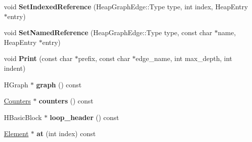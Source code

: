 \begin{DoxyCompactItemize}
\item 
\hypertarget{classv8_1_1internal_1_1_b_a_s_e___e_m_b_e_d_d_e_d_a4a35fe6e32a869862da78762ed93acc9}{}void {\bfseries Set\+Indexed\+Reference} (Heap\+Graph\+Edge\+::\+Type type, int index, Heap\+Entry $\ast$entry)\label{classv8_1_1internal_1_1_b_a_s_e___e_m_b_e_d_d_e_d_a4a35fe6e32a869862da78762ed93acc9}

\item 
\hypertarget{classv8_1_1internal_1_1_b_a_s_e___e_m_b_e_d_d_e_d_a7b46e4d76169f1f95740f096760eaa5f}{}void {\bfseries Set\+Named\+Reference} (Heap\+Graph\+Edge\+::\+Type type, const char $\ast$name, Heap\+Entry $\ast$entry)\label{classv8_1_1internal_1_1_b_a_s_e___e_m_b_e_d_d_e_d_a7b46e4d76169f1f95740f096760eaa5f}

\item 
\hypertarget{classv8_1_1internal_1_1_b_a_s_e___e_m_b_e_d_d_e_d_a2e226396cafd804daba5c33a68d66fe9}{}void {\bfseries Print} (const char $\ast$prefix, const char $\ast$edge\+\_\+name, int max\+\_\+depth, int indent)\label{classv8_1_1internal_1_1_b_a_s_e___e_m_b_e_d_d_e_d_a2e226396cafd804daba5c33a68d66fe9}

\item 
\hypertarget{classv8_1_1internal_1_1_b_a_s_e___e_m_b_e_d_d_e_d_a586a8eaff2221ab14e3b55d7c67cb96f}{}H\+Graph $\ast$ {\bfseries graph} () const \label{classv8_1_1internal_1_1_b_a_s_e___e_m_b_e_d_d_e_d_a586a8eaff2221ab14e3b55d7c67cb96f}

\item 
\hypertarget{classv8_1_1internal_1_1_b_a_s_e___e_m_b_e_d_d_e_d_a7000aae4fa8500fbfcc0ab49b77a9bc4}{}\hyperlink{classv8_1_1internal_1_1_counters}{Counters} $\ast$ {\bfseries counters} () const \label{classv8_1_1internal_1_1_b_a_s_e___e_m_b_e_d_d_e_d_a7000aae4fa8500fbfcc0ab49b77a9bc4}

\item 
\hypertarget{classv8_1_1internal_1_1_b_a_s_e___e_m_b_e_d_d_e_d_afc037675c8f31bc2752d2ea343512a22}{}H\+Basic\+Block $\ast$ {\bfseries loop\+\_\+header} () const \label{classv8_1_1internal_1_1_b_a_s_e___e_m_b_e_d_d_e_d_afc037675c8f31bc2752d2ea343512a22}

\item 
\hypertarget{classv8_1_1internal_1_1_b_a_s_e___e_m_b_e_d_d_e_d_ae259307b278347c66d326da73f200650}{}\hyperlink{classv8_1_1internal_1_1_b_a_s_e___e_m_b_e_d_d_e_d_1_1_element}{Element} $\ast$ {\bfseries at} (int index) const \label{classv8_1_1internal_1_1_b_a_s_e___e_m_b_e_d_d_e_d_ae259307b278347c66d326da73f200650}


\end{DoxyCompactItemize}
